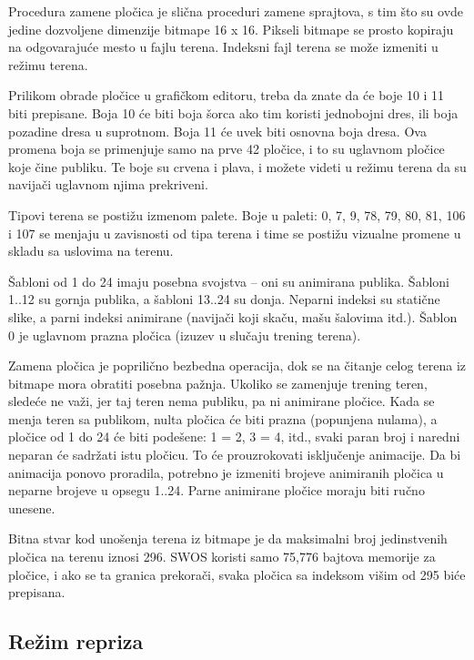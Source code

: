 \documentclass[a4paper,12pt]{article}
\begin{document}
Procedura zamene plo\v cica je sli\v cna proceduri zamene sprajtova, s tim \v sto su ovde jedine dozvoljene
dimenzije bitmape 16 x 16. Pikseli bitmape se prosto kopiraju na odgovaraju\'ce mesto u fajlu terena. Indeksni
fajl terena se mo\v ze izmeniti u re\v zimu terena.

Prilikom obrade plo\v cice u grafi\v ckom editoru, treba da znate da \'ce boje 10 i 11 biti prepisane. Boja 10
\'ce biti boja \v sorca ako tim koristi jednobojni dres, ili boja pozadine dresa u suprotnom. Boja 11 \'ce uvek
biti osnovna boja dresa. Ova promena boja se primenjuje samo na prve 42 plo\v cice, i to su uglavnom plo\v cice
koje \v cine publiku. Te boje su crvena i plava, i mo\v zete videti u re\v zimu terena da su navija\v ci uglavnom
njima prekriveni.

Tipovi terena se posti\v zu izmenom palete. Boje u paleti: 0, 7, 9, 78, 79, 80,
81, 106 i 107 se menjaju u zavisnosti od tipa terena i time se posti\v zu
vizualne promene u skladu sa uslovima na terenu.

\v Sabloni od 1 do 24 imaju posebna svojstva -- oni su animirana publika.
\v Sabloni 1..12 su gornja publika, a \v sabloni 13..24 su donja. Neparni
indeksi su stati\v cne slike, a parni indeksi animirane (navija\v ci koji
ska\v cu, ma\v su \v salovima itd.). \v Sablon 0 je uglavnom prazna plo\v cica
(izuzev u slu\v caju trening terena).

Zamena plo\v cica je poprili\v cno bezbedna operacija, dok se na \v citanje
celog terena iz bitmape mora obratiti posebna pa\v znja. Ukoliko se zamenjuje
trening teren, slede\'ce ne va\v zi, jer taj teren nema publiku, pa ni
animirane plo\v cice. Kada se menja teren sa publikom, nulta plo\v cica \'ce
biti prazna (popunjena nulama), a plo\v cice od 1 do 24 \'ce biti pode\v sene:
1 = 2, 3 = 4, itd., svaki paran broj i naredni neparan \'ce sadr\v zati istu
plo\v cicu. To \'ce prouzrokovati isklju\v cenje animacije. Da bi animacija
ponovo proradila, potrebno je izmeniti brojeve animiranih plo\v cica u neparne
brojeve u opsegu 1..24. Parne animirane plo\v cice moraju biti ru\v cno
unesene.

Bitna stvar kod uno\v senja terena iz bitmape je da maksimalni broj
jedinstvenih plo\v cica na terenu iznosi 296. SWOS koristi samo 75,776 bajtova
memorije za plo\v cice, i ako se ta granica prekora\v ci, svaka plo\v cica sa
indeksom vi\v sim od 295 bi\'ce prepisana.

\newpage
\subsection{Re\v zim repriza}
\end{document}
